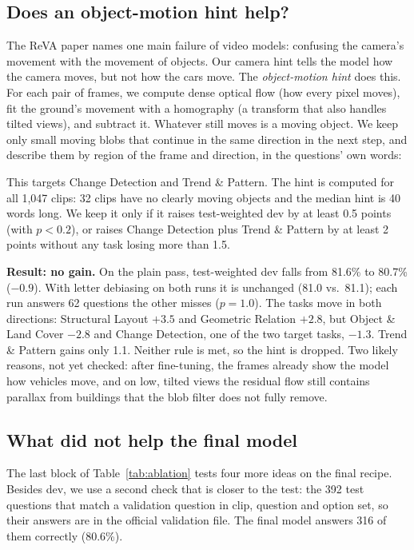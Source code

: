 \subsection{Does an object-motion hint help?}
\label{sec:objmotion}
The ReVA paper names one main failure of video models: confusing the
camera's movement with the movement of objects. Our camera hint tells the
model how the camera moves, but not how the cars move. The
\emph{object-motion hint} does this. For each pair of frames, we
compute dense optical flow (how every pixel moves), fit the ground's
movement with a homography (a transform that also handles tilted views),
and subtract it. Whatever still moves is a moving object. We keep only
small moving blobs that continue in the same direction in the next step,
and describe them by region of the frame and direction, in the questions'
own words:

\smallskip
\noindent{}
\smallskip

\noindent This targets Change Detection and Trend \& Pattern. The hint is
computed for all 1,047 clips: 32 clips have no clearly moving objects and
the median hint is 40 words long. We keep it only if it raises
test-weighted dev by at least 0.5 points (with $p<0.2$), or raises Change
Detection plus Trend \& Pattern by at least 2 points without any task
losing more than 1.5.

\textbf{Result: no gain.} On the plain pass, test-weighted dev falls from
81.6\% to 80.7\% ($-0.9$). With letter debiasing on both runs it is
unchanged (81.0 vs.\ 81.1); each run answers 62 questions the other
misses ($p{=}1.0$). The tasks move in both directions: Structural Layout
$+3.5$ and Geometric Relation $+2.8$, but Object \& Land Cover $-2.8$ and
Change Detection, one of the two target tasks, $-1.3$. Trend \& Pattern
gains only 1.1. Neither rule is met, so the hint is dropped. Two likely
reasons, not yet checked:
after fine-tuning, the frames already show the model how vehicles move,
and on low, tilted views the residual flow still contains parallax from
buildings that the blob filter does not fully remove.



\subsection{What did not help the final model}
\label{sec:final-ablation}
The last block of Table~\ref{tab:ablation} tests four more ideas on the
final recipe. Besides dev, we use a second check that is closer to the
test: the 392 test questions that match a validation question in clip,
question and option set, so their answers are in the official validation
file. The final model answers 316 of them correctly (80.6\%).

